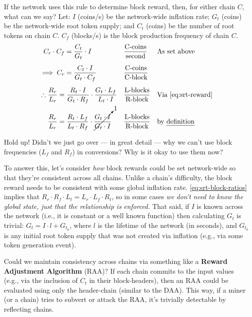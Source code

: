 If the network uses this rule to determine block reward, then, for either chain $C$, what can we say?
Let: $I$ (coins/s) be the network-wide inflation rate; $G_t$ (coins) be the network-wide root token supply; and $C_t$ (coins) be the number of root tokens on chain $C$. $C_f$ (blocks/s) is the block production frequency of chain $C$.
\begin{align}
    C_r \cdot C_f & = \frac{C_t}{G_t} \cdot I
        & & \frac{\text{C-coins}}{\text{second}}
        & & \text{As set above}
        \nonumber
        \\[0.5em]
    \implies C_r & = \frac{C_t \cdot I}{G_t \cdot C_f}
        & & \frac{\text{C-coins}}{\text{C-block}}
        & & \label{eq:srt-reward}
        \\[0.5em]
    \therefore \frac{R_r}{L_r} =& \; \frac{R_t \cdot I}{G_t \cdot R_f} \cdot \frac{G_t \cdot L_f}{L_t \cdot I}
        & & \frac{\text{L-blocks}}{\text{R-block}}
        & & \text{Via \autoref{eq:srt-reward}}
        \nonumber
        \\[0.0em]
    \frac{R_r}{L_r} =& \; \frac{R_t \cdot L_f}{L_t \cdot R_f} \cdot \cancelto{1}{\frac{G_t \cdot I}{G_t \cdot I}}
        & & \frac{\text{L-blocks}}{\text{R-block}}
        & & \text{by \emph{definition}}
        \label{eq:srt-block-ratios}
\end{align}

Hold up!
Didn't we just go over --- in great detail --- why we can't use block frequencies ($L_f$ and $R_f$) in conversions?
Why is it okay to use them now?

To answer this, let's consider \emph{how} block rewards could be set network-wide so that they're consistent across all chains.
Unlike a chain's difficulty, the block reward needs to be consistent with some global inflation rate.
\autoref{eq:srt-block-ratios} implies that $R_r \cdot R_f \cdot L_t = L_r \cdot L_f \cdot R_t$, so in some cases \emph{we don't need to know the global state, just that the relationship is enforced.}
That said, if $I$ is known across the network (i.e., it is constant or a well known function) then calculating $G_t$ is trivial: $G_t = I \cdot l + G_{t_0}$, where $l$ is the lifetime of the network (in seconds), and $G_{t_0}$ is any initial root token supply that was not created via inflation (e.g., via some token generation event).

Could we maintain consistency across chains via something like a \textbf{Reward Adjustment Algorithm} (RAA)?
If each chain commits to the input values (e.g., via the inclusion of $C_t$ in their block-headers), then an RAA could be evaluated using only the header-chain (similar to the DAA).
This way, if a miner (or a chain) tries to subvert or attack the RAA, it's trivially detectable by reflecting chains.

